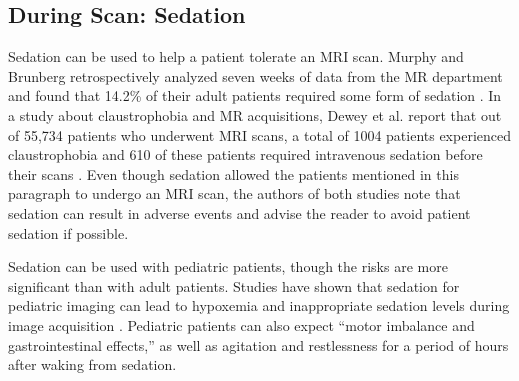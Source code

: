 \subsection{During Scan: Sedation}

Sedation can be used to help a patient tolerate an MRI scan. Murphy and Brunberg retrospectively analyzed seven weeks of data from the MR department and found that 14.2\% of their adult patients required some form of sedation \cite{Murphy1997}. In a study about claustrophobia and MR acquisitions, Dewey et al. report that out of 55,734 patients who underwent MRI scans, a total of 1004 patients experienced claustrophobia and 610 of these patients required intravenous sedation before their scans \cite{Dewey2007}. Even though sedation allowed the patients mentioned in this paragraph to undergo an MRI scan, the authors of both studies note that sedation can result in adverse events and advise the reader to avoid patient sedation if possible.


Sedation can be used with pediatric patients, though the risks are more significant than with adult patients. Studies have shown that sedation for pediatric imaging can lead to hypoxemia and inappropriate sedation levels during image acquisition \cite{Malviya2000}. Pediatric patients can also expect ``motor imbalance and gastrointestinal effects,'' as well as agitation and restlessness for a period of hours after waking from sedation.

